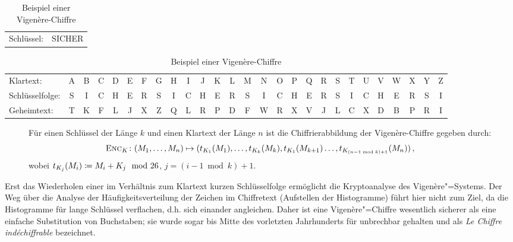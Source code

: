 \begin{table}[h]
  \centering
  \setlength{\tabcolsep}{2pt}
  \begin{tabular}{ll}
    Schlüssel: 
    & SICHER
  \end{tabular}
  \begin{tabular}{l*{26}{c}}
    Klartext:
    &A&B&C&D&E&F&G&H&I&J&K&L&M&N&O&P&Q&R&S&T&U&V&W&X&Y&Z\\
    Schlüsselfolge:
    &S&I&C&H&E&R&S&I&C&H&E&R&S&I&C&H&E&R&S&I&C&H&E&R&S&I\\
    Geheimtext:
    &T&K&F&L&J&X&Z&Q&L&R&P&D&F&W&R&X&V&J&L&C&X&D&B&P&R&I\\
  \end{tabular}
  \caption{Beispiel einer Vigenère-Chiffre}
\end{table}

\begin{figure}[h]
  Für einen Schlüssel der Länge $k$ und einen Klartext der Länge $n$ ist die Chiffrierabbildung der Vigenère-Chiffre gegeben durch:
  \begin{align*}
    \textsc{Enc}_{K}\colon (M_1,\ldots,M_{n}) \mapsto
    (t_{K_1}(M_1),\ldots,t_{K_{k}}(M_{k}),t_{K_1}(M_{k+1})\ldots,t_{K_{(n-1
    \bmod k)+1}}(M_{n}))\, ,
  \end{align*}
  wobei $t_{K_{j}}(M_{i}) \coloneqq M_{i} + K_{j} \mod
  26$, $j = (i-1 \bmod k)+1$. 
\end{figure}
Erst das Wiederholen einer im Verhältnis zum Klartext kurzen
Schlüsselfolge ermöglicht die Kryptoanalyse des Vigenère"=Systems.  Der
Weg über die Analyse der Häufigkeitsverteilung der Zeichen im
Chiffretext (Aufstellen der Histogramme) führt hier nicht zum Ziel, da
die Histogramme für lange Schlüssel verflachen, d.h. sich einander
angleichen. Daher ist eine Vigenère"=Chiffre wesentlich sicherer als
eine einfache Substitution von Buchstaben; sie wurde sogar bis Mitte des
vorletzten Jahrhunderts für unbrechbar gehalten und als \emph{Le Chiffre
indéchiffrable} bezeichnet.

